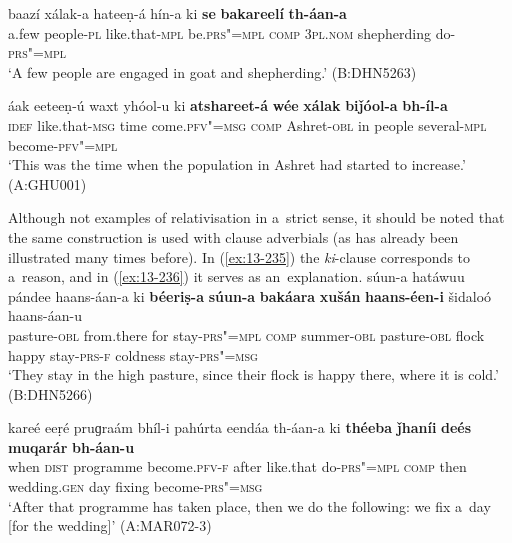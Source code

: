 \ex
\label{ex:13-233}
\gll baazí xálak-a hateeṇ-á hín-a ki \textbf{se} \textbf{bakareelí} \textbf{th-áan-a}\\
a.few people-\textsc{pl}  like.that-\textsc{mpl} be.\textsc{prs"=mpl} \textsc{comp}  \textsc{3pl.nom}  shepherding do-\textsc{prs"=mpl} \\
\glt `A few people are engaged in goat and shepherding.' (B:DHN5263)

\ex
\label{ex:13-234}
\gll áak eeteeṇ-ú waxt yhóol-u ki  \textbf{atshareet-á} \textbf{wée} \textbf{xálak} \textbf{biǰóol-a} \textbf{bh-íl-a} \\
\textsc{idef} like.that-\textsc{msg} time come.\textsc{pfv"=msg} \textsc{comp} Ashret-\textsc{obl} in people several-\textsc{mpl} become-\textsc{pfv"=mpl} \\
\glt `This was the time when the population in Ashret had started to increase.' (A:GHU001) 
\z

Although not examples of relativisation in a~strict sense, it should be noted that the same construction is used with clause adverbials (as has already been illustrated many times before). In (\ref{ex:13-235}) the \textit{ki}-clause corresponds to a~reason, and in (\ref{ex:13-236}) it serves as an~explanation.
\ea
\label{ex:13-235}
\gll súun-a hatáwuu pándee haans-áan-a ki \textbf{béeriṣ-a} \textbf{súun-a} \textbf{bakáara} \textbf{xušán} \textbf{haans-éen-i} šidaloó haans-áan-u\\
pasture-\textsc{obl} from.there for stay-\textsc{prs"=mpl} \textsc{comp}  summer-\textsc{obl} pasture-\textsc{obl} flock happy stay-\textsc{prs-f} coldness stay-\textsc{prs"=msg}\\
\glt `They stay in the high pasture, since their flock is happy there, where it is cold.' (B:DHN5266)

\ex
\label{ex:13-236}
\gll kareé eeṛé pruɡraám bhíl-i pahúrta eendáa  th-áan-a ki \textbf{théeba} \textbf{ǰhaníi} \textbf{deés} \textbf{muqarár} \textbf{bh-áan-u}\\
when \textsc{dist} programme become.\textsc{pfv-f} after like.that do-\textsc{prs"=mpl} \textsc{comp} then wedding.\textsc{gen} day fixing become-\textsc{prs"=msg}\\
\glt `After that programme has taken place, then we do the following: we fix a~day [for the wedding]' (A:MAR072-3)
\z